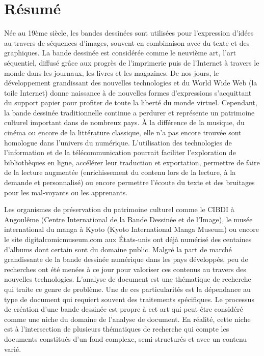 \chapter*{R{\'e}sum{\'e}}

Née au 19ème siècle, les bandes dessinées sont utilisées pour l'expression d'idées au travers de séquences d'images, souvent en combinaison avec du texte et des graphiques.
La bande dessinée est considérée comme le neuvième art, l'art séquentiel, diffusé grâce aux progrès de l'imprimerie puis de l'Internet à travers le monde dans les journaux, les livres et les magazines.
De nos jours, le développement grandissant des nouvelles technologies et du World Wide Web (la toile Internet) donne naissance à de nouvelles formes d'expressions s'acquittant du support papier pour profiter de toute la liberté du monde virtuel.
Cependant, la bande dessinée traditionnelle continue a perdurer et représente un patrimoine culturel important dans de nombreux pays.
À la différence de la musique, du cinéma ou encore de la littérature classique, elle n'a pas encore trouvée sont homologue dans l'univers du numérique.
L'utilisation des technologies de l'information et de la télécommunication pourrait faciliter l'exploration de bibliothèques en ligne, accélérer leur traduction et exportation, permettre de faire de la lecture augmentée (enrichissement du contenu lors de la lecture, à la demande et personnalisé) ou encore permettre l'écoute du texte et des bruitages pour les mal-voyants ou les apprenants.

Les organismes de préservation du patrimoine culturel comme le CIBDI à Angoulême (Centre International de la Bande Dessinée et de l'Image), le musée international du manga à Kyoto (Kyoto International Manga Museum) ou encore le site digitalcomicmuseum.com aux États-unis ont déjà numérisé des centaines d'albums dont certain sont du domaine public.
Malgré la part de marché grandissante de la bande dessinée numérique dans les pays développés, peu de recherches ont été menées à ce jour pour valoriser ces contenus au travers des nouvelles technologies.
L'analyse de document est une thématique de recherche qui traite ce genre de problème. Une de ces particularités est la dépendance au type de document qui requiert souvent des traitements spécifiques.
Le processus de création d'une bande dessinée est propre à cet art qui peut être considéré comme une niche du domaine de l'analyse de document.
En réalité, cette niche est à l'intersection de plusieurs thématiques de recherche qui compte les documents constitués d'un fond complexe, semi-structurés et avec un contenu varié.

